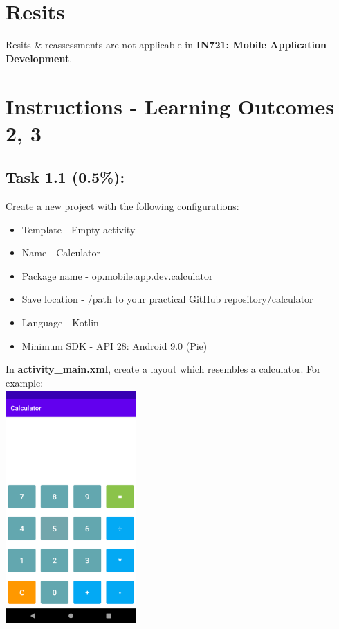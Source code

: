 \documentclass{article}
\begin{document}
\section*{Resits}
Resits \& reassessments are not applicable in \textbf{IN721: Mobile Application Development}.

\section*{Instructions - Learning Outcomes 2, 3}

\subsection*{Task 1.1 (0.5\%):} 

Create a new project with the following configurations:
\begin{itemize}
	\item Template - Empty activity
	\item Name - Calculator
	\item Package name - op.mobile.app.dev.calculator
	\item Save location - /path to your practical GitHub repository/calculator
	\item Language - Kotlin
	\item Minimum SDK - API 28: Android 9.0 (Pie) 
\end{itemize} 

In \textbf{activity\_main.xml}, create a layout which resembles a calculator. For example: \\

\includegraphics[width=5cm, height=9cm]{../tex/img/02-android-overview/practical/calculator-1.png}  \\
\end{document}

